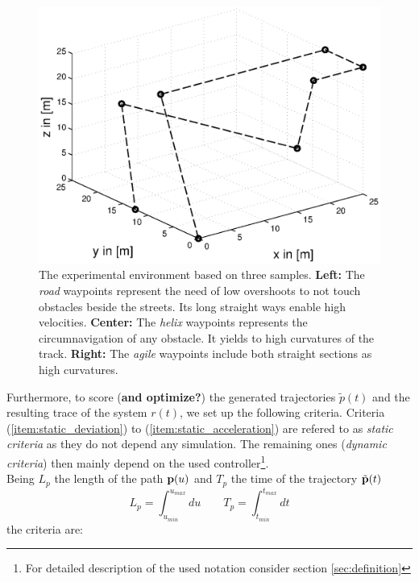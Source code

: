 \begin{figure}[h]
\begin{minipage}[t]{0.32\textwidth}
    \includegraphics[width = \textwidth]{graphics/sampleNodeAgile}
  \end{minipage}
  \caption{The experimental environment based on three samples. {\bf Left:} The \textit{road} waypoints represent the need of low overshoots to not touch obstacles beside the streets. Its long straight ways enable high velocities. {\bf Center:} The \textit{helix} waypoints represents the circumnavigation of any obstacle. It yields to high curvatures of the track. {\bf Right:} The \textit{agile} waypoints include both straight sections as high curvatures.}
  \label{fig:sampleNodes}
\end{figure}


Furthermore, to score (\textbf{and optimize?}) the generated trajectories $\tilde{p}(t)$ and the resulting trace of the system $r(t)$, we set up the following criteria. Criteria (\ref{item:static_deviation}) to (\ref{item:static_acceleration}) are refered to as \textit{static criteria} as they do not depend any simulation. The remaining ones (\textit{dynamic criteria}) then mainly depend on the used controller\footnote{For detailed description of the used notation consider section \ref{sec:definition}}.
\\
Being $L_p$ the length of the path ${\bf p}(u)$ and $T_p$ the time of the trajectory $\tilde{\bf p}(t)$
\begin{equation}
L_p = \int_{u_{min}}^{u_{max}} du \qquad T_p = \int_{t_{min}}^{t_{max}} dt
\label{eq:length_of_path}
\end{equation}
the criteria are:

